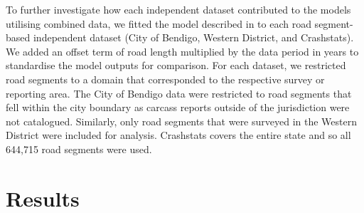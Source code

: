 To further investigate how each independent dataset contributed to the models utilising combined data, we fitted the model described in  to each road segment-based independent dataset (City of Bendigo, Western District, and Crashstats). We added an offset term of road length multiplied by the data period in years to standardise the model outputs for comparison. For each dataset, we restricted road segments to a domain that corresponded to the respective survey or reporting area. The City of Bendigo data were restricted to road segments that fell within the city boundary as carcass reports outside of the jurisdiction were not catalogued. Similarly, only road segments that were surveyed in the Western District were included for analysis. Crashstats covers the entire state and so all 644,715 road segments were used. 

\section{Results}

